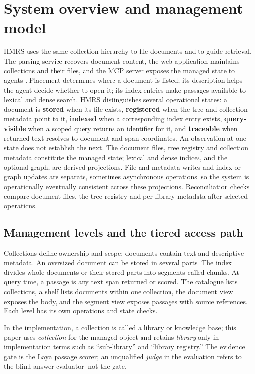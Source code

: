 \section{System overview and management model}
\label{sec:system}

HMRS uses the same collection hierarchy to file documents and to guide
retrieval. The parsing service recovers document content, the web application
maintains collections and their files, and the MCP server exposes the managed
state to agents \cite{mcp}. Placement determines where a document is listed;
its description helps the agent decide whether to open it; its index entries
make passages available to lexical and dense search. HMRS distinguishes
several operational states: a document is \textbf{stored} when its file exists,
\textbf{registered} when the tree and collection metadata point to it,
\textbf{indexed} when a corresponding index entry exists, \textbf{query-visible}
when a scoped query returns an identifier for it, and \textbf{traceable} when
returned text resolves to document and span coordinates. An observation at one
state does not establish the next. The document files, tree registry and
collection metadata constitute the managed state; lexical and dense indices,
and the optional graph, are derived projections. File and metadata writes and
index or graph updates are separate, sometimes asynchronous operations, so the
system is operationally eventually consistent across these projections.
Reconciliation checks compare document files, the tree registry and
per-library metadata after selected operations.

\subsection{Management levels and the tiered access path}
\label{sec:levels}

Collections define ownership and scope; documents contain text and
descriptive metadata. An oversized document can be stored in several parts. The index divides
whole documents or their stored parts into segments called chunks. At query time, a passage is any
text span returned or scored. The catalogue lists collections, a shelf lists documents within one
collection, the document view exposes the body, and the segment view exposes
passages with source references. Each level has its own operations and
state checks.

In the implementation, a collection is called a library or knowledge base;
this paper uses \emph{collection} for the managed object and retains
\emph{library} only in implementation terms such as ``sub-library'' and
``library registry.'' The evidence gate is the Laya passage scorer; an
unqualified \emph{judge} in the evaluation refers to the blind answer
evaluator, not the gate.

